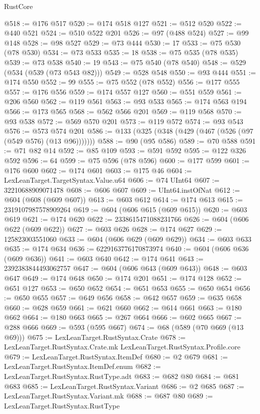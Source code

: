 \begin{lexlean}{RustCore}
\begin{coremodule}
@518 := @176 @517
@520 := @174 @518 @127
@521 := @512 @520
@522 := @440 @521
@524 := @510 @522 @201
@526 := @97 (@488 @524)
@527 := @99 @148
@528 := @98 @527
@529 := @73 @444
@530 := 17
@533 := @75 @530 (@78 @530)
@534 := @73 @533
@535 := 18
@538 := @75 @535 (@78 @535)
@539 := @73 @538
@540 := 19
@543 := @75 @540 (@78 @540)
@548 := @529 (@534 (@539 (@73 @543 @82)))
@549 := @528 @548
@550 := @93 @444
@551 := @174 @550
@552 := 99
@555 := @75 @552 (@78 @552)
@556 := @177 @555
@557 := @176 @556
@559 := @174 @557 @127
@560 := @551 @559
@561 := @206 @560
@562 := @119 @561
@563 := @93 @533
@565 := @174 @563 @194
@566 := @173 @565
@568 := @562 @566 @201
@569 := @119 @568
@570 := @93 @538
@572 := @569 @570 @201
@573 := @119 @572
@574 := @93 @543
@576 := @573 @574 @201
@586 := @133 (@325 (@348 (@429 (@467 (@526 (@97 (@549 @576) (@13 @96)))))))
@588 := @90 (@95 @586)
@589 := @70 @588
@591 := @71 @82 @14
@592 := @85 @109
@593 := @591 @592
@595 := @122 @326 @592
@596 := 64
@599 := @75 @596 (@78 @596)
@600 := @177 @599
@601 := @176 @600
@602 := @174 @601
@603 := @175 @46
@604 := LexLeanTarget.TargetSyntax.Value.u64
@606 := @74 UInt64
@607 := 32210688909071478
@608 := @606 @607
@609 := UInt64.instOfNat
@612 := @604 (@608 (@609 @607))
@613 := @603 @612
@614 := @174 @613
@615 := 2319107987578909264
@619 := @604 (@606 @615 (@609 @615))
@620 := @603 @619
@621 := @174 @620
@622 := 2338615471088231766
@626 := @604 (@606 @622 (@609 @622))
@627 := @603 @626
@628 := @174 @627
@629 := 125823003551060
@633 := @604 (@606 @629 (@609 @629))
@634 := @603 @633
@635 := @174 @634
@636 := 6229163776170873974
@640 := @604 (@606 @636 (@609 @636))
@641 := @603 @640
@642 := @174 @641
@643 := 2392383844493062757
@647 := @604 (@606 @643 (@609 @643))
@648 := @603 @647
@649 := @174 @648
@650 := @174 @201
@651 := @174 @128
@652 := @651 @127
@653 := @650 @652
@654 := @651 @653
@655 := @650 @654
@656 := @650 @655
@657 := @649 @656
@658 := @642 @657
@659 := @635 @658
@660 := @628 @659
@661 := @621 @660
@662 := @614 @661
@663 := @180 @662
@664 := @180 @663
@665 := @267 @664
@666 := @602 @665
@667 := @288 @666
@669 := @593 (@595 @667)
@674 := @68 (@589 (@70 @669 (@13 @69)))
@675 := LexLeanTarget.RustSyntax.Crate
@678 := LexLeanTarget.RustSyntax.Crate.mk LexLeanTarget.RustSyntax.Profile.core
@679 := LexLeanTarget.RustSyntax.ItemDef
@680 := @2 @679
@681 := LexLeanTarget.RustSyntax.ItemDef.enum
@682 := LexLeanTarget.RustSyntax.RustType.adt
@683 := @682 @80
@684 := @681 @683
@685 := LexLeanTarget.RustSyntax.Variant
@686 := @2 @685
@687 := LexLeanTarget.RustSyntax.Variant.mk
@688 := @687 @80
@689 := LexLeanTarget.RustSyntax.RustType

\end{coremodule}
\end{lexlean}
